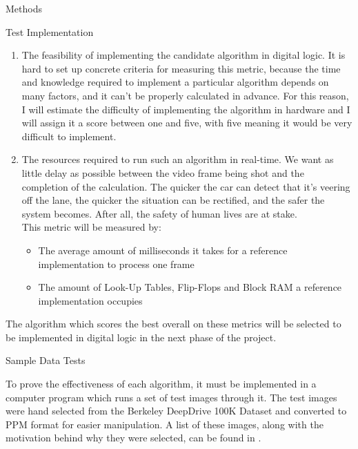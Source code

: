 \documentclass{matthijs}
\begin{document}
\begin{hoofdstuk}{Methods}
\begin{paragraaf}{Test Implementation}
\begin{enumerate}
				\item	The feasibility of implementing the candidate algorithm in digital logic.
					It is hard to set up concrete criteria for measuring this metric, because the time and knowledge required to implement a particular algorithm depends on many factors, and it can't be properly calculated in advance.
					For this reason, I will estimate the difficulty of implementing the algorithm in hardware and I will assign it a score between one and five, with five meaning it would be very difficult to implement.

				\item	The resources required to run such an algorithm in real-time.
					We want as little delay as possible between the video frame being shot and the completion of the calculation.
					The quicker the car can detect that it's veering off the lane, the quicker the situation can be rectified, and the safer the system becomes.
					After all, the safety of human lives are at stake.\\
					This metric will be measured by:

					\begin{itemize}

						\item	The average amount of milliseconds it takes for a reference implementation to process one frame
						
						\item	The amount of Look-Up Tables, Flip-Flops and Block RAM a reference implementation occupies

					\end{itemize}

			\end{enumerate}

			The algorithm which scores the best overall on these metrics will be selected to be implemented in digital logic in the next phase of the project.
		\end{paragraaf}

		\begin{paragraaf}{Sample Data Tests}

			To prove the effectiveness of each algorithm, it must be implemented in a computer program which runs a set of test images through it.
			The test images were hand selected from the Berkeley DeepDrive 100K Dataset \cite{yu2020bdd100k} and converted to PPM format for easier manipulation.
			A list of these images, along with the motivation behind why they were selected, can be found in .


\end{paragraaf}
\end{hoofdstuk}
\end{document}
